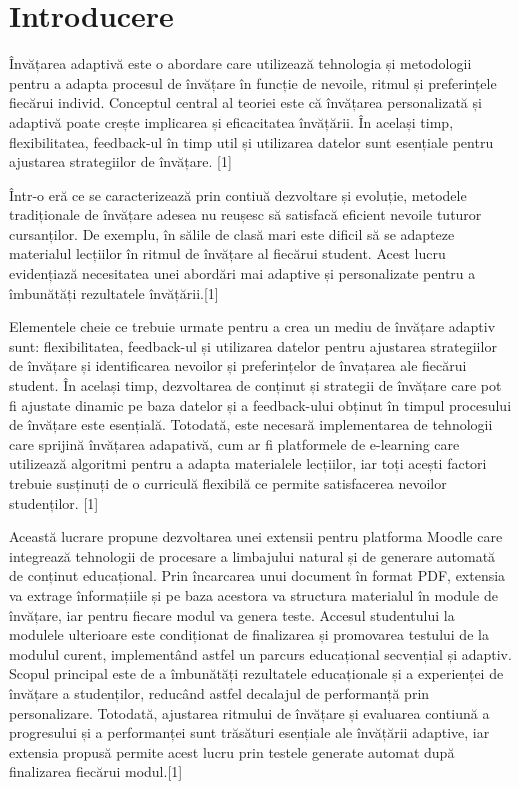 \chapter*{Introducere} 

Învățarea adaptivă este o abordare care utilizează tehnologia și metodologii pentru a adapta procesul de învățare în funcție de nevoile, ritmul și preferințele fiecărui individ. Conceptul 
central al teoriei este că învățarea personalizată și adaptivă poate crește implicarea și eficacitatea învățării. În același timp, flexibilitatea, feedback-ul în timp util și utilizarea 
datelor sunt esențiale pentru ajustarea strategiilor de învățare. [1]

Într-o eră ce se caracterizează prin contiuă dezvoltare și evoluție, metodele tradi\-țio\-na\-le de învățare adesea nu reușesc să satisfacă eficient nevoile tuturor cursanților. De exemplu, în 
sălile de clasă mari este dificil să se adapteze materialul lecțiilor în ritmul de învățare al fiecărui student. Acest lucru evidențiază necesitatea unei abordări mai adaptive și personalizate 
pentru a îmbunătăți rezultatele învățării.[1]

Elementele cheie ce trebuie urmate pentru a crea un mediu de învățare adaptiv sunt: flexibilitatea, feedback-ul și utilizarea datelor pentru ajustarea strategiilor de învățare și 
identificarea nevoilor și preferințelor de învațarea ale fiecărui student. În același timp, dezvoltarea de conținut și strategii de învățare care pot fi ajustate dinamic pe baza datelor și 
a feedback-ului obținut în timpul procesului de învățare este esențială. Totodată, este necesară implementarea de tehnologii care sprijină învățarea adapativă, cum ar fi platformele de
e-learning care utilizează algoritmi pentru a adapta materialele lecțiilor, iar toți acești factori trebuie susținuți de o curriculă flexibilă ce permite satisfacerea nevoilor 
studenților. [1] 

Această lucrare propune dezvoltarea unei extensii pentru platforma Moodle care integrează tehnologii de procesare a limbajului natural și de generare automată de conținut educațional. 
Prin încarcarea unui document în format PDF, extensia va extrage înformațiile și pe baza acestora va structura materialul în module de învățare, iar pentru fiecare modul va genera teste. 
Accesul studentului la modulele ulterioare este condiționat de finalizarea și promovarea testului de la modulul curent, implementând astfel un parcurs educațional secvențial și adaptiv. 
Scopul principal este de a îmbunătăți rezultatele educaționale și a experienței de învățare a studenților, reducând astfel decalajul de performanță prin personalizare. Totodată, ajustarea 
ritmului de învățare și evaluarea contiună a progresului și a performanței sunt trăsături esențiale ale învățării adaptive, iar extensia propusă permite acest lucru prin testele generate
automat după finalizarea fiecărui modul.[1] 